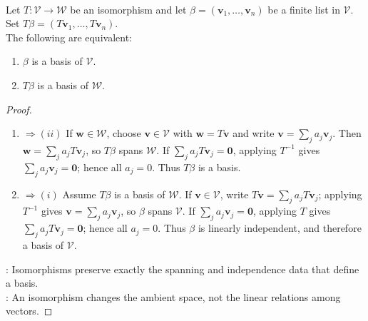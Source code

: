 \begin{proposition} \label{prop:isomorphisms-preserve-bases} \\
Let $T:\mathcal{V}\to\mathcal{W}$ be an isomorphism and let $\beta=(\mathbf{v}_1,\ldots,\mathbf{v}_n)$ be a finite list in $\mathcal{V}$. Set $T\beta=(T\mathbf{v}_1,\ldots,T\mathbf{v}_n)$.\\
The following are equivalent:
\begin{enumerate}[label=(\roman*)]
\setlength{\itemsep}{0pt}
\item $\beta$ is a basis of $\mathcal{V}$.
\item $T\beta$ is a basis of $\mathcal{W}$.
\end{enumerate}
\begin{proof}
\begin{enumerate}[label=(\roman*).]
\setlength{\itemsep}{0pt}
\item[$(i)$]$\Rightarrow (ii)$ If $\mathbf{w}\in\mathcal{W}$, choose $\mathbf{v}\in\mathcal{V}$ with $\mathbf{w}=T\mathbf{v}$ and write $\mathbf{v}=\sum_j a_j\mathbf{v}_j$. Then $\mathbf{w}=\sum_j a_jT\mathbf{v}_j$, so $T\beta$ spans $\mathcal{W}$. If $\sum_j a_jT\mathbf{v}_j=\mathbf{0}$, applying $T^{-1}$ gives $\sum_j a_j\mathbf{v}_j=\mathbf{0}$; hence all $a_j=0$. Thus $T\beta$ is a basis.
\item[$(ii)$]$\Rightarrow (i)$
Assume $T\beta$ is a basis of $\mathcal{W}$. If $\mathbf{v}\in\mathcal{V}$, write $T\mathbf{v}=\sum_j a_jT\mathbf{v}_j$; applying $T^{-1}$ gives $\mathbf{v}=\sum_j a_j\mathbf{v}_j$, so $\beta$ spans $\mathcal{V}$. If $\sum_j a_j\mathbf{v}_j=\mathbf{0}$, applying $T$ gives $\sum_j a_jT\mathbf{v}_j=\mathbf{0}$; hence all $a_j=0$. Thus $\beta$ is linearly independent, and therefore a basis of $\mathcal{V}$.
\end{enumerate}
: Isomorphisms preserve exactly the spanning and independence data that define a basis.\\
: An isomorphism changes the ambient space, not the linear relations among vectors.
\end{proof}
\end{proposition}

